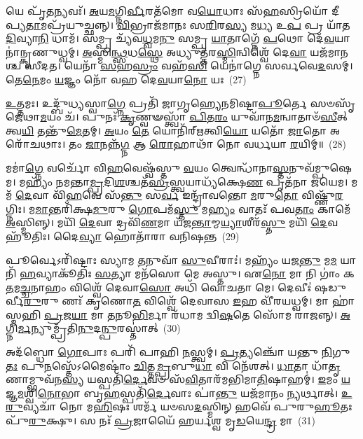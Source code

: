 𑌯𑍇 𑌪𑍃᳴\-\ul{𑌤}\-𑌨𑍍𑌯𑌵𑌃᳴। \ul{𑌅}\-𑌯\-\ul{𑌮}\-𑌗𑍍𑌨𑌿\-\ul{𑌰𑍍𑌵𑍀}\-𑌰𑌤᳴𑌮𑍋 𑌵\-\ul{𑌯𑍋}\-𑌧𑌾𑌃 𑌸᳴\-\ul{𑌹}\-𑌸𑍍𑌰𑌿𑌯𑍋᳴ 𑌦𑍀𑌪𑍍𑌯\-\ul{𑌤𑌾}\-𑌮𑌪𑍍𑌰᳴𑌯𑍁𑌚𑍍𑌛𑌨𑍍𑌨𑍍। \ul{𑌵𑌿}\-𑌭𑍍𑌰𑌾𑌜᳴𑌮𑌾𑌨𑌃 𑌸\-\ul{𑌰𑌿}\-𑌰\-\ul{𑌸𑍍𑌯} 𑌮\-\ul{𑌧𑍍𑌯} 𑌉\-\ul{𑌪} 𑌪𑍍𑌰 𑌯𑌾᳴𑌤 \ul{𑌦𑌿}\-𑌵𑍍𑌯𑌾\-\ul{𑌨𑌿} 𑌧𑌾𑌮᳴। 𑌸𑌮𑍍𑌪𑍍𑌰 𑌚𑍍𑌯᳴𑌵\-\ul{𑌧𑍍𑌵}\-𑌮\-\ul{𑌨𑍁} 𑌸𑌮𑍍𑌪𑍍𑌰 \ul{𑌯𑌾}\-𑌤𑌾𑌗𑍍𑌨𑍇᳴ \ul{𑌪}\-𑌥𑍋 𑌦𑍇᳴\-\ul{𑌵}\-𑌯𑌾𑌨𑌾॑𑌨𑍍𑌕𑍃𑌣𑍁𑌧𑍍𑌵𑌮𑍍। \ul{𑌅}\-𑌸𑍍𑌮𑌿\-\ul{𑌨𑍍𑌥𑍍𑌸}\-𑌧\-\ul{𑌸𑍍𑌥𑍇} 𑌅𑌧𑍍𑌯𑍁𑌤𑍍𑌤᳴𑌰\-\ul{𑌸𑍍𑌮𑌿}\-𑌨𑍍𑌵𑌿𑌶𑍍𑌵𑍇᳴ 𑌦𑍇\-\ul{𑌵𑌾} 𑌯𑌜᳴𑌮𑌾𑌨𑌶𑍍𑌚 𑌸𑍀𑌦𑌤। 𑌯𑍇𑌨𑌾᳴ \ul{𑌸}\-𑌹\-\ul{𑌸𑍍𑌰𑌂} 𑌵𑌹᳴\-\ul{𑌸𑌿} 𑌯𑍇𑌨𑌾॑𑌗𑍍𑌨𑍇 𑌸𑌰𑍍𑌵𑌵𑍇\-\ul{𑌦}\-𑌸𑌮𑍍। 𑌤𑍇\-\ul{𑌨𑍇}\-𑌮𑌂 \ul{𑌯}\-𑌜𑍍𑌞𑌂 𑌨𑍋᳴ 𑌵𑌹 𑌦𑍇\-\ul{𑌵}\-𑌯𑌾\-\ul{𑌨𑍋} 𑌯𑌃~(27)

\-\ul{𑌉}\-\-\ul{𑌤𑍍𑌤}\-𑌮𑌃। 𑌉𑌦𑍍𑌬𑍁᳴𑌧𑍍𑌯𑌸𑍍𑌵𑌾\-\ul{𑌗𑍍𑌨𑍇} 𑌪𑍍𑌰𑌤𑌿᳴ 𑌜𑌾𑌗𑍃𑌹𑍍𑌯𑍇𑌨𑌮𑌿𑌷𑍍𑌟𑌾\-\ul{𑌪𑍂}\-𑌰𑍍𑌤𑍇 𑌸𑍞𑌸𑍃᳴𑌜𑍇𑌥𑌾\-\ul{𑌮}\-𑌯𑌂 𑌚᳴। 𑌪𑍁𑌨𑌃᳴ \ul{𑌕𑍃}\-𑌣𑍍𑌵𑍟𑌸𑍍𑌤𑍍𑌵𑌾᳴ \ul{𑌪𑌿}\-𑌤\-\ul{𑌰𑌂} 𑌯𑍁𑌵𑌾᳴𑌨\-\ul{𑌮}\-𑌨𑍍𑌵𑌾𑌤𑌾𑍞᳴\-\ul{𑌸𑍀}\-𑌤𑍍 𑌤𑍍𑌵\-\ul{𑌯𑌿} 𑌤𑌨𑍍𑌤𑍁᳴\-\ul{𑌮𑍇}\-𑌤𑌮𑍍। \ul{𑌅}\-𑌯𑌂 \ul{𑌤𑍇} 𑌯𑍋𑌨𑌿᳴𑌰𑍍\mbox{}\-\ul{𑌋}\-𑌤𑍍𑌵𑌿\-\ul{𑌯𑍋} 𑌯𑌤𑍋᳴ \ul{𑌜𑌾}\-𑌤𑍋 𑌅𑌰𑍋᳴𑌚𑌥𑌾𑌃। 𑌤𑌂 \ul{𑌜𑌾}\-𑌨𑌨𑍍𑌨᳴\-\ul{𑌗𑍍𑌨} 𑌆 \ul{𑌰𑍋}\-𑌹𑌾𑌥𑌾᳴ 𑌨𑍋 𑌵𑌰𑍍𑌧𑌯𑌾 \ul{𑌰}\-𑌯𑌿𑌮𑍍॥~(28)

{\anuvakamend[{\-\ul{𑌧𑍍𑌰𑍁}\-𑌵𑌃 \ul{𑌸}\-𑌤𑍍𑌰𑌂 𑌕𑍃᳴𑌣𑍁\-\ul{𑌤𑍇} 𑌯𑌃 \ul{𑌸}\-𑌪𑍍𑌤𑌤𑍍𑌰𑌿𑍞᳴𑌶𑌚𑍍𑌚}]}%

𑌮𑌮𑌾॑\-\ul{𑌗𑍍𑌨𑍇} 𑌵𑌰𑍍𑌚𑍋᳴ 𑌵𑌿\-\ul{𑌹}\-𑌵𑍇𑌷𑍍𑌵᳴𑌸𑍍𑌤𑍁 \ul{𑌵}\-𑌯𑌂 𑌤𑍍𑌵𑍇𑌨𑍍𑌧𑌾᳴𑌨𑌾\-\ul{𑌸𑍍𑌤}\-𑌨𑍁𑌵᳴𑌮𑍍𑌪𑍁𑌷𑍇𑌮। 𑌮𑌹𑍍𑌯𑌂᳴ 𑌨𑌮𑌨𑍍𑌤𑌾\-\ul{𑌮𑍍𑌪𑍍𑌰}\-𑌦𑌿\-\ul{𑌶}\-𑌶𑍍𑌚𑌤᳴\-\ul{𑌸𑍍𑌰}\-𑌸𑍍𑌤𑍍𑌵𑌯𑌾𑌧𑍍𑌯᳴𑌕𑍍𑌷𑍇\-\ul{𑌣} 𑌪𑍃𑌤᳴𑌨𑌾 𑌜𑌯𑍇𑌮। 𑌮𑌮᳴ \ul{𑌦𑍇}\-𑌵𑌾 𑌵𑌿᳴\-\ul{𑌹}\-𑌵𑍇 𑌸᳴\-\ul{𑌨𑍍𑌤𑍁} 𑌸\-\ul{𑌰𑍍𑌵} 𑌇𑌨𑍍𑌦𑍍𑌰𑌾᳴𑌵𑌨𑍍𑌤𑍋 \ul{𑌮}\-𑌰𑍁\-\ul{𑌤𑍋} 𑌵𑌿𑌷𑍍𑌣𑍁᳴\-\ul{𑌰}\-𑌗𑍍𑌨𑌿𑌃। 𑌮\-\ul{𑌮𑌾}\-𑌨𑍍𑌤𑌰𑌿᳴𑌕𑍍𑌷\-\ul{𑌮𑍁}\-𑌰𑍁 \ul{𑌗𑍋}\-𑌪𑌮᳴\-\ul{𑌸𑍍𑌤𑍁} 𑌮\-\ul{𑌹𑍍𑌯𑌂} 𑌵𑌾𑌤𑌃᳴ 𑌪𑌵\-\ul{𑌤𑌾𑌂} 𑌕𑌾𑌮𑍇᳴ \ul{𑌅}\-𑌸𑍍𑌮𑌿𑌨𑍍𑌨𑍍। 𑌮𑌯𑌿᳴ \ul{𑌦𑍇}\-𑌵𑌾 𑌦𑍍𑌰𑌵𑌿᳴\-\ul{𑌣}\-𑌮𑌾 𑌯᳴𑌜\-\ul{𑌨𑍍𑌤𑌾}\-𑌮𑍍𑌮\-\ul{𑌯𑍍𑌯𑌾}\-𑌶𑍀𑌰᳴\-\ul{𑌸𑍍𑌤𑍁} 𑌮𑌯𑌿᳴ \ul{𑌦𑍇}\-𑌵𑌹𑍂᳴𑌤𑌿𑌃। 𑌦𑍈\-\ul{𑌵𑍍𑌯𑌾} 𑌹𑍋𑌤𑌾᳴𑌰𑌾 𑌵𑌨𑌿𑌷𑌨𑍍𑌤~(29)

𑌪𑍂𑌰𑍍𑌵𑍇\-𑌽𑌰𑌿᳴𑌷𑍍𑌟𑌾𑌃 𑌸𑍍𑌯𑌾𑌮 \ul{𑌤}\-𑌨𑍁𑌵𑌾᳴ \ul{𑌸𑍁}\-𑌵𑍀𑌰𑌾𑌃॑। 𑌮𑌹𑍍𑌯𑌂᳴ 𑌯𑌜\-\ul{𑌨𑍍𑌤𑍁} 𑌮\-\ul{𑌮} 𑌯𑌾𑌨𑌿᳴ \ul{𑌹}\-𑌵𑍍𑌯𑌾𑌕𑍂᳴𑌤𑌿𑌃 \ul{𑌸}\-𑌤𑍍𑌯𑌾 𑌮𑌨᳴𑌸𑍋 𑌮𑍇 𑌅𑌸𑍍𑌤𑍁। 𑌏\-\ul{𑌨𑍋} 𑌮𑌾 𑌨𑌿 𑌗𑌾𑌂॑ 𑌕\-\ul{𑌤}\-𑌮\-\ul{𑌚𑍍𑌚}\-𑌨𑌾𑌹𑌂 𑌵𑌿𑌶𑍍𑌵𑍇᳴ 𑌦𑍇𑌵𑌾\-\ul{𑌸𑍋} 𑌅𑌧𑌿᳴ 𑌵𑍋𑌚𑌤𑌾 𑌮𑍇। 𑌦𑍇𑌵𑍀𑌃॑ 𑌷𑌡𑍁𑌰𑍍𑌵𑍀\-\ul{𑌰𑍁}\-𑌰𑍁 𑌣𑌃᳴ 𑌕𑍃𑌣𑍋\-\ul{𑌤} 𑌵𑌿𑌶𑍍𑌵𑍇᳴ 𑌦𑍇𑌵𑌾𑌸 \ul{𑌇}\-𑌹 𑌵𑍀᳴𑌰𑌯𑌧𑍍𑌵𑌮𑍍। 𑌮𑌾 𑌹𑌾॑𑌸𑍍𑌮𑌹𑌿 \ul{𑌪𑍍𑌰}\-𑌜\-\ul{𑌯𑌾} 𑌮𑌾 \ul{𑌤}\-𑌨𑍂\-\ul{𑌭𑌿}\-𑌰𑍍𑌮𑌾 𑌰᳴𑌧𑌾𑌮 𑌦𑍍𑌵𑌿\-\ul{𑌷}\-𑌤𑍇 𑌸𑍋᳴𑌮 𑌰𑌾𑌜𑌨𑍍𑌨𑍍। \ul{𑌅}\-𑌗𑍍𑌨𑌿\-\ul{𑌰𑍍𑌮}\-𑌨𑍍𑌯𑍁𑌮𑍍𑌪𑍍𑌰᳴𑌤𑌿\-\ul{𑌨𑍁}\-𑌦\-\ul{𑌨𑍍𑌪𑍁}\-𑌰𑌸𑍍𑌤𑌾॑𑌤𑍍~(30)

𑌅𑌦᳴𑌬𑍍𑌧𑍋 \ul{𑌗𑍋}\-𑌪𑌾𑌃 𑌪𑌰𑌿᳴ 𑌪𑌾𑌹𑌿 \ul{𑌨}\-𑌸𑍍𑌤𑍍𑌵𑌮𑍍। \ul{𑌪𑍍𑌰}\-𑌤𑍍𑌯𑌞𑍍𑌚𑍋᳴ 𑌯𑌨𑍍𑌤𑍁 \ul{𑌨𑌿}\-𑌗𑍁\-\ul{𑌤𑌃} 𑌪𑍁\-\ul{𑌨}\-𑌸𑍍𑌤𑍇᳴\-𑌽𑌮𑍈𑌷𑌾𑌂॑ \ul{𑌚𑌿}\-𑌤𑍍𑌤\-\ul{𑌮𑍍𑌪𑍍𑌰}\-𑌬𑍁\-\ul{𑌧𑌾} 𑌵𑌿 𑌨𑍇᳴𑌶𑌤𑍍। \ul{𑌧𑌾}\-𑌤𑌾 𑌧𑌾᳴\-\ul{𑌤𑍃}\-𑌣𑌾𑌮𑍍𑌭𑍁𑌵᳴𑌨\-\ul{𑌸𑍍𑌯} 𑌯𑌸𑍍𑌪𑌤𑌿᳴\-\ul{𑌰𑍍𑌦𑍇}\-𑌵𑍞 𑌸᳴\-\ul{𑌵𑌿}\-𑌤𑌾𑌰᳴𑌮𑌭𑌿𑌮𑌾\-\ul{𑌤𑌿}\-𑌷𑌾𑌹𑌮𑍍॑। \ul{𑌇}\-𑌮𑌂 \ul{𑌯}\-𑌜𑍍𑌞\-\ul{𑌮}\-𑌶𑍍𑌵𑌿\-\ul{𑌨𑍋}\-𑌭𑌾 𑌬𑍃\-\ul{𑌹}\-𑌸𑍍𑌪𑌤𑌿᳴\-\ul{𑌰𑍍𑌦𑍇}\-𑌵𑌾𑌃 𑌪𑌾॑\-\ul{𑌨𑍍𑌤𑍁} 𑌯𑌜᳴𑌮𑌾𑌨𑌂 \ul{𑌨𑍍𑌯}\-𑌰𑍍𑌥𑌾𑌤𑍍। \ul{𑌉}\-\-\ul{𑌰𑍁}\-𑌵𑍍𑌯𑌚𑌾᳴ 𑌨𑍋 𑌮\-\ul{𑌹𑌿}\-𑌷𑌃 𑌶𑌰𑍍𑌮᳴ 𑌯𑍞𑌸\-\ul{𑌦}\-𑌸𑍍𑌮𑌿𑌨𑍍 𑌹𑌵𑍇᳴ 𑌪𑍁𑌰𑍁\-\ul{𑌹𑍂}\-𑌤𑌃 𑌪𑍁᳴\-\ul{𑌰𑍁}\-𑌕𑍍𑌷𑍁। 𑌸 𑌨𑌃᳴ \ul{𑌪𑍍𑌰}\-𑌜𑌾𑌯𑍈᳴ 𑌹𑌰𑍍𑌯𑌶𑍍𑌵 𑌮𑍃\-\ul{𑌡}\-𑌯𑍇\-\ul{𑌨𑍍𑌦𑍍𑌰} 𑌮𑌾~(31)

